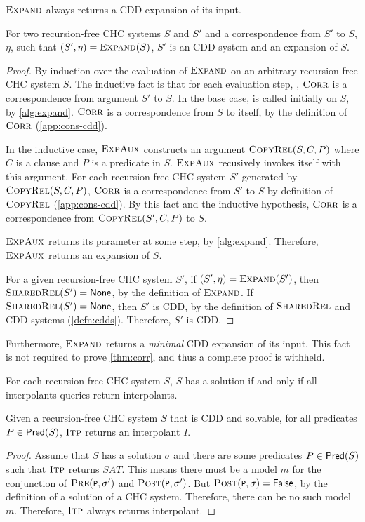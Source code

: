 $\textsc{Expand}$ always returns a CDD expansion of its input.
%
\begin{lem}
  \label{lem:expand-corr}
  For two recursion-free CHC systems $S$ and $S'$ and a correspondence
  from $S'$ to $S$, $\eta$, such that $(S', \eta) = \textsc{Expand}(S)$,
  $S'$ is an CDD system and an expansion of $S$.
\end{lem}
%
\begin{proof}
  By induction over the evaluation of $\textsc{Expand}$ on
  an arbitrary recursion-free CHC system $S$.
  The inductive fact is that for each evaluation step, \expandaux,
  $\textsc{Corr}$ is a correspondence from argument
  $S'$ to $S$.
  In the base case, \expandaux is called initially on $S$,
  by \autoref{alg:expand}.
  $\textsc{Corr}$ is a correspondence from $S$ to itself, by the definition of
  $\textsc{Corr}$
  (\autoref{app:cons-cdd}).

  In the inductive case,
  $\textsc{ExpAux}$ constructs an argument
  $\textsc{CopyRel}(S, C, P)$
  where $C$ is a clause and $P$ is a predicate in $S$.
  $\textsc{ExpAux}$ recusively invokes itself with this argument.
  For each recursion-free CHC system $S'$ generated by $\textsc{CopyRel}(S, C, P)$,
  $\textsc{Corr}$ is a correspondence from $S'$ to
  $S$ by definition of $\textsc{CopyRel}$
  (\autoref{app:cons-cdd}).
  By this fact and the inductive hypothesis, $\textsc{Corr}$ is
  a correspondence from $\textsc{CopyRel}(S',
  C, P)$ to $S$.

  $\textsc{ExpAux}$ returns its parameter at some step, by
  \autoref{alg:expand}.
  Therefore, $\textsc{ExpAux}$ returns an expansion of $S$.

  For a given recursion-free CHC system $S'$, if $(S', \eta) =
  \textsc{Expand}(S')$,
  then $\textsc{SharedRel}(S') = \mathsf{None}$, by the definition of $\textsc{Expand}$.
  If $\textsc{SharedRel}(S') = \mathsf{None}$, then $S'$ is
  CDD, by the definition of $\textsc{SharedRel}$ and CDD systems
  (\autoref{defn:cdds}).
  Therefore, $S'$ is CDD.
\end{proof}
%
Furthermore, $\textsc{Expand}$ returns a \emph{minimal} CDD
expansion of its input.
%
This fact is not required to prove \autoref{thm:corr}, and thus a
complete proof is withheld.

For each recursion-free CHC system $S$, $S$ has a solution if and only
if all interpolants queries return interpolants.
%
\begin{lem}
  \label{lem:vc}
  Given a recursion-free CHC system $S$ that is CDD and solvable, for
  all predicates $P \in \mathsf{Pred}( S )$,
  $\textsc{Itp}$ returns
  an interpolant $I$.
\end{lem}
%
\begin{proof}
  Assume that $S$ has a solution $\sigma$ and there are some
  predicates $P \in \mathsf{Pred}( S )$ such that
  $\textsc{Itp}$
  returns $SAT$. This means there must be a model $m$ for the
  conjunction of $\prectr(\cc{P},\sigma')$ and
  $\postctr(\cc{P},\sigma')$.
  But $\postctr(\cc{P},\sigma) = \false$, by the definition of
  a solution of a CHC system.
  Therefore, there can be no such model $m$.
  Therefore,
  $\textsc{Itp}$ always
  returns interpolant.
\end{proof}

